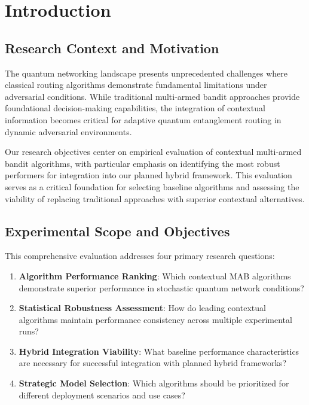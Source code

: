\documentclass[12pt,a4paper]{article}
\begin{document}
\section{Introduction}

\subsection{Research Context and Motivation}

The quantum networking landscape presents unprecedented challenges where classical routing algorithms demonstrate fundamental limitations under adversarial conditions. While traditional multi-armed bandit approaches provide foundational decision-making capabilities, the integration of contextual information becomes critical for adaptive quantum entanglement routing in dynamic adversarial environments.

Our research objectives center on empirical evaluation of contextual multi-armed bandit algorithms, with particular emphasis on identifying the most robust performers for integration into our planned hybrid framework. This evaluation serves as a critical foundation for selecting baseline algorithms and assessing the viability of replacing traditional approaches with superior contextual alternatives.

\subsection{Experimental Scope and Objectives}

This comprehensive evaluation addresses four primary research questions:

\begin{enumerate}
\item \textbf{Algorithm Performance Ranking}: Which contextual MAB algorithms demonstrate superior performance in stochastic quantum network conditions?
\item \textbf{Statistical Robustness Assessment}: How do leading contextual algorithms maintain performance consistency across multiple experimental runs?
\item \textbf{Hybrid Integration Viability}: What baseline performance characteristics are necessary for successful integration with planned hybrid frameworks?
\item \textbf{Strategic Model Selection}: Which algorithms should be prioritized for different deployment scenarios and use cases?
\end{enumerate}
\end{document}
